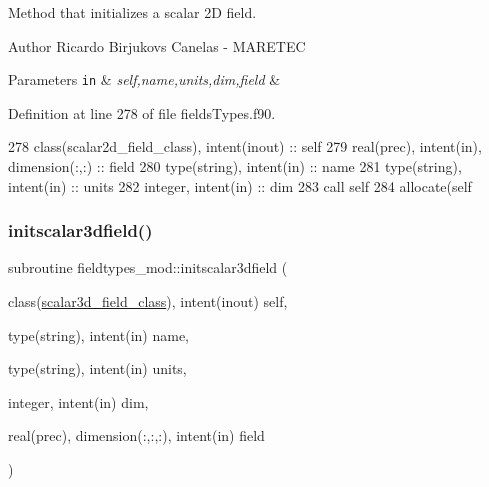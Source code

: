 Method that initializes a scalar 2D field. 

\begin{DoxyAuthor}{Author}
Ricardo Birjukovs Canelas -\/ M\+A\+R\+E\+T\+EC 
\end{DoxyAuthor}

\begin{DoxyParams}[1]{Parameters}
\mbox{\tt in}  & {\em self,name,units,dim,field} & \\
\hline
\end{DoxyParams}


Definition at line 278 of file fields\+Types.\+f90.


\begin{DoxyCode}
278     \textcolor{keywordtype}{class}(scalar2d\_field\_class), \textcolor{keywordtype}{intent(inout)} :: self
279     \textcolor{keywordtype}{real(prec)}, \textcolor{keywordtype}{intent(in)}, \textcolor{keywordtype}{dimension(:,:)} :: field
280     \textcolor{keywordtype}{type}(string), \textcolor{keywordtype}{intent(in)} :: name
281     \textcolor{keywordtype}{type}(string), \textcolor{keywordtype}{intent(in)} :: units
282     \textcolor{keywordtype}{integer}, \textcolor{keywordtype}{intent(in)} :: dim
283     \textcolor{keyword}{call }self%
284     \textcolor{keyword}{allocate}(self%
\end{DoxyCode}
\mbox{\label{namespacefieldtypes__mod_a3f2b90bc391ea5b84ead8069ee90f515}} 
\subsubsection{\texorpdfstring{initscalar3dfield()}{initscalar3dfield()}}
{\footnotesize\ttfamily subroutine fieldtypes\+\_\+mod\+::initscalar3dfield (\begin{DoxyParamCaption}\item[{class(\mbox{\hyperlink{structfieldtypes__mod_1_1scalar3d__field__class}{scalar3d\+\_\+field\+\_\+class}}), intent(inout)}]{self,  }\item[{type(string), intent(in)}]{name,  }\item[{type(string), intent(in)}]{units,  }\item[{integer, intent(in)}]{dim,  }\item[{real(prec), dimension(\+:,\+:,\+:), intent(in)}]{field }\end{DoxyParamCaption})\hspace{0.3cm}{\ttfamily [private]}}



